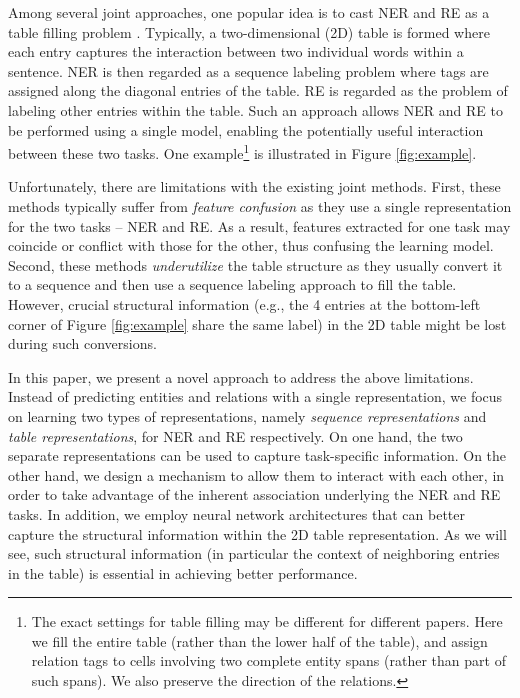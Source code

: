 \documentclass[11pt,a4paper]{article}
\begin{document}
Among several joint approaches, one popular idea is to cast NER and RE as a table filling problem \cite{miwa2014modeling,gupta2016table,zhang2017end}.
Typically, a two-dimensional (2D) table is formed where each entry captures the interaction between two individual words within a sentence.
NER is then regarded as a sequence labeling problem where tags are assigned along the diagonal entries of the table.
RE is regarded as the problem of labeling other entries within the table.
Such an approach allows NER and RE to be performed using a single model, enabling the potentially useful interaction between these two tasks.
One example\footnote{
The exact settings for table filling may be different for different papers.
Here we fill the entire table (rather than the lower half of the table), and assign relation tags to cells involving two complete entity spans (rather than part of such spans).
We also preserve the direction of the relations.}
is illustrated in Figure \ref{fig:example}.

Unfortunately, there are limitations with the existing joint methods. First, these methods typically suffer from \emph{feature confusion} as they use a single representation for the two tasks -- NER and RE. As a result, features extracted for one task may coincide or conflict with those for the other, thus confusing the learning model.
Second, these methods \emph{underutilize} the table structure as they usually convert it to a sequence and then use a sequence labeling approach to fill the table. However, crucial structural information (e.g.,
the 4 entries at the bottom-left corner of Figure \ref{fig:example} share the same label) in the 2D table might be lost during such conversions.

In this paper, we present a novel approach to address the above limitations.
Instead of predicting entities and relations with a single representation,
we focus on learning two types of representations, namely \emph{sequence representations} and \emph{table representations}, for NER and RE respectively.
On one hand, the two separate representations can be used to capture task-specific information.
On the other hand, we design a mechanism to allow them to interact with each other, in order to take advantage of the inherent association underlying the NER and RE tasks.
In addition, we employ neural network architectures that can better capture the structural information within the 2D table representation.
As we will see, such structural information (in particular the context of neighboring entries in the table) is essential in achieving better performance.
\end{document}

